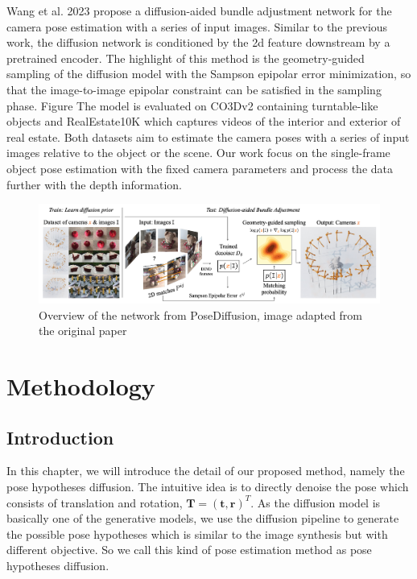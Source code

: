 \documentclass[12pt,DIV14,BCOR12mm,a4paper,footinclude=false,headinclude,parskip=half-,twoside,openright,cleardoublepage=empty,toc=index,bibliography=totoc,listof=totoc]{scrreprt}
\numberwithin{equation}{chapter}
\begin{document}
Wang et al. 2023 \cite{wang2023pd} propose a diffusion-aided bundle adjustment network for the camera pose estimation with a series of input images. Similar to the previous work, the diffusion network is conditioned by the \gls{2d} feature downstream by a pretrained encoder. The highlight of this method is the geometry-guided sampling of the diffusion model with the Sampson epipolar error minimization, so that the image-to-image epipolar constraint can be satisfied in the sampling phase. Figure The model is evaluated on CO3Dv2 \cite{reizenstein2021common} containing turntable-like objects and RealEstate10K \cite{zhou2018stereo} which captures videos of the interior and exterior of real estate. Both datasets aim to estimate the camera poses with a series of input images relative to the object or the scene. Our work focus on the single-frame object pose estimation with the fixed camera parameters and process the data further with the depth information.

\begin{figure}[h]
	\centering
	\includegraphics[scale=0.21]{img/pose_diff.png}
	\caption{Overview of the network from PoseDiffusion, image adapted from the original paper \cite{wang2023pd}}
	\label{img:pose_diff}
\end{figure}

\chapter{Methodology}
\section{Introduction}
In this chapter, we will introduce the detail of our proposed method, namely the pose hypotheses diffusion. The intuitive idea is to directly denoise the pose which consists of translation and rotation, $\mathbf{T} = (\mathbf{t}, \mathbf{r})^{T}$. As the diffusion model is basically one of the generative models, we use the diffusion pipeline to generate the possible pose hypotheses which is similar to the image synthesis but with different objective. So we call this kind of pose estimation method as pose hypotheses diffusion.
\end{document}
